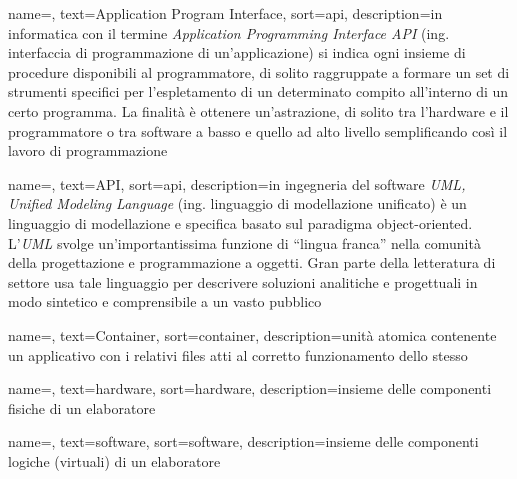 
\renewcommand{\acronymname}{Acronimi e abbreviazioni}




{
    name=,
    text=Application Program Interface,
    sort=api,
    description={in informatica con il termine \emph{Application Programming Interface API} (ing. interfaccia di programmazione di un'applicazione) si indica ogni insieme di procedure disponibili al programmatore, di solito raggruppate a formare un set di strumenti specifici per l'espletamento di un determinato compito all'interno di un certo programma. La finalità è ottenere un'astrazione, di solito tra l'hardware e il programmatore o tra software a basso e quello ad alto livello semplificando così il lavoro di programmazione}
}

{
    name=,
    text=API,
    sort=api, 
    description={in ingegneria del software \emph{UML, Unified Modeling Language} (ing. linguaggio di modellazione unificato) è un linguaggio di modellazione e specifica basato sul paradigma object-oriented. L'\emph{UML} svolge un'importantissima funzione di ``lingua franca'' nella comunità della progettazione e programmazione a oggetti. Gran parte della letteratura di settore usa tale linguaggio per descrivere soluzioni analitiche e progettuali in modo sintetico e comprensibile a un vasto pubblico}
}

{
    name=,
    text=Container,
    sort=container, 
    description={unità atomica contenente un applicativo con i relativi files atti al corretto funzionamento dello stesso}
}

{
    name=,
    text=hardware,
    sort=hardware, 
    description={insieme delle componenti fisiche di un elaboratore}
}

{
    name=,
    text=software,
    sort=software, 
    description={insieme delle componenti logiche (virtuali) di un elaboratore}
}

